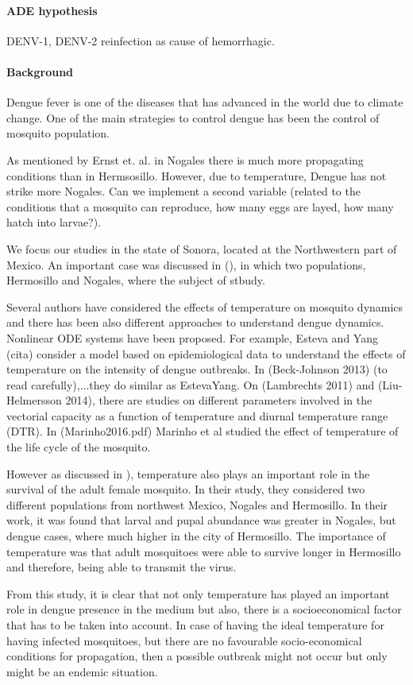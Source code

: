 \paragraph{ADE hypothesis}
\ac{DENV-1}, \ac{DENV-2}
reinfection as cause of hemorrhagic.
\paragraph{Background}

	Dengue fever is one of the diseases that has advanced in the 
world due to climate change. One of the main strategies to control dengue has been the control of mosquito population.

	As mentioned by Ernst et. al. \citet{Ernst2016} in Nogales there 
is much more propagating conditions than in Hermsosillo. However, 
due to temperature, Dengue has not strike more Nogales. Can we 
implement a second variable (related to the conditions that a 
mosquito can reproduce, how many eggs are layed, how many hatch into larvae?).

\noindent We focus our studies in the state of Sonora, located at the Northwestern part of Mexico. An important case was discussed in (\cite{Ernst2016}), in which two populations, Hermosillo and Nogales, where the subject of stbudy.

\noindent Several authors have considered the effects of temperature on mosquito dynamics and there has been also different approaches to understand dengue dynamics. Nonlinear ODE systems have been proposed. For example, Esteva and Yang (cita) consider a model based on epidemiological data to understand the effects of temperature on the intensity of dengue outbreaks. In (Beck-Johnson 2013) (to read carefully),...they do similar as EstevaYang. On (Lambrechts 2011) and (Liu-Helmersson 2014), there are studies on different parameters involved in the vectorial capacity as a function of temperature and diurnal temperature range (DTR). In (Marinho2016.pdf) Marinho et al studied the effect of temperature of the life cycle of the mosquito.


\noindent However as discussed in \cite{Ernst2016}), temperature also plays an important role in the survival of the adult female mosquito. In their study, they considered two different populations from northwest Mexico, Nogales and Hermosillo. In their work, it was found that larval and pupal abundance was greater in Nogales, but dengue cases, where much higher in the city of Hermosillo. The importance of temperature was that adult mosquitoes were able to survive longer in Hermosillo and therefore, being able to transmit the virus.

\noindent From this study, it is clear that not only temperature has played an important role in dengue presence in the medium but also, there is a socioeconomical factor that has to be taken into account. In case of having the ideal temperature for having infected mosquitoes, but there are no favourable socio-economical conditions for propagation, then a possible outbreak might not occur but only might be an endemic situation.

